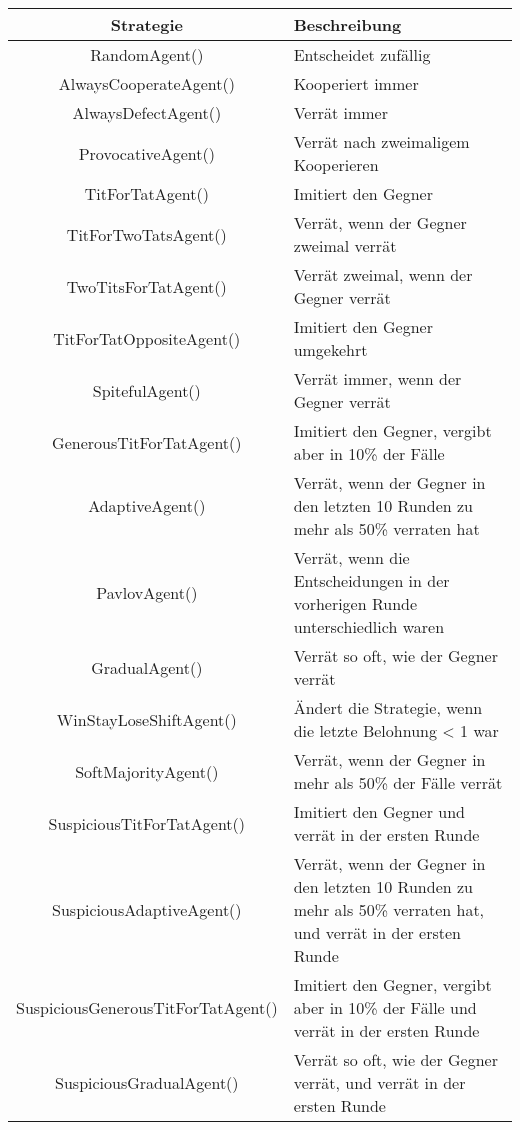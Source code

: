 \begin{longtable}{|c|m{7cm}|}
    \hline
    \textbf{Strategie} & \textbf{Beschreibung} \\
    \hline
    RandomAgent() & Entscheidet zufällig \\
    \hline
    AlwaysCooperateAgent() & Kooperiert immer \\
    \hline
    AlwaysDefectAgent() & Verrät immer \\
    \hline
    ProvocativeAgent() & Verrät nach zweimaligem Kooperieren \\
    \hline
    TitForTatAgent() & Imitiert den Gegner \\
    \hline
    TitForTwoTatsAgent() & Verrät, wenn der Gegner zweimal verrät \\
    \hline
    TwoTitsForTatAgent() & Verrät zweimal, wenn der Gegner verrät \\
    \hline
    TitForTatOppositeAgent() & Imitiert den Gegner umgekehrt \\
    \hline
    SpitefulAgent() & Verrät immer, wenn der Gegner verrät \\
    \hline
    GenerousTitForTatAgent() & Imitiert den Gegner, vergibt aber in 10\% der Fälle \\
    \hline
    AdaptiveAgent() & Verrät, wenn der Gegner in den letzten 10 Runden zu mehr als 50\% verraten hat \\
    \hline
    PavlovAgent() & Verrät, wenn die Entscheidungen in der vorherigen Runde unterschiedlich waren \\
    \hline
    GradualAgent() & Verrät so oft, wie der Gegner verrät \\
    \hline
    WinStayLoseShiftAgent() & Ändert die Strategie, wenn die letzte Belohnung < 1 war \\
    \hline
    SoftMajorityAgent() & Verrät, wenn der Gegner in mehr als 50\% der Fälle verrät \\
    \hline
    SuspiciousTitForTatAgent() & Imitiert den Gegner und verrät in der ersten Runde \\
    \hline
    SuspiciousAdaptiveAgent() & Verrät, wenn der Gegner in den letzten 10 Runden zu mehr als 50\% verraten hat, und verrät in der ersten Runde \\
    \hline
    SuspiciousGenerousTitForTatAgent() & Imitiert den Gegner, vergibt aber in 10\% der Fälle und verrät in der ersten Runde \\
    \hline
    SuspiciousGradualAgent() & Verrät so oft, wie der Gegner verrät, und verrät in der ersten Runde \\

\end{longtable}
